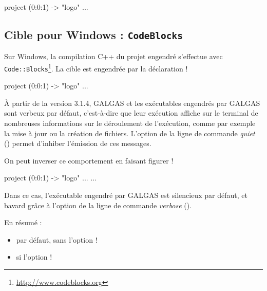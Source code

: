\begin{galgas3}
project (0:0:1) -> "logo" {
  ...
}
\end{galgas3}



\subsection{Cible pour Windows : \texttt{CodeBlocks}}

Sur Windows, la compilation C++ du projet engendré s'effectue avec \texttt{Code{}::Blocks}\footnote{\url{http://www.codeblocks.org}}. La cible est engendrée par la déclaration \ggst!%

\begin{galgas3}
project (0:0:1) -> "logo" {
  ...
}
\end{galgas3}






À partir de la version 3.1.4, GALGAS et les exécutables engendrés par GALGAS sont verbeux par défaut, c'est-à-dire que leur exécution affiche sur le terminal de nombreuses informations sur le déroulement de l'exécution, comme par exemple la mise à jour ou la création de fichiers. L'option de la ligne de commande \emph{quiet} () permet d'inhiber l'émission de ces messages.

On peut inverser ce comportement en faisant figurer \ggst!%
\begin{galgas3}
project (0:0:1) -> "logo" {
  ...
  ...
}
\end{galgas3}

 Dans ce cas, l'exécutable engendré par GALGAS est silencieux par défaut, et bavard grâce à l'option de la ligne de commande \emph{verbose} ().

En résumé :
\begin{itemize}
\item par défaut, sans l'option \ggst!%
\item si l'option \ggst!%
\end{itemize}

